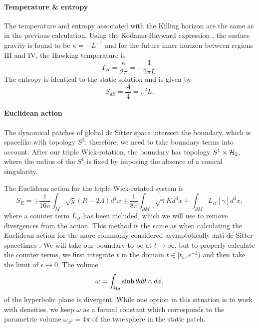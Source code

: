 \paragraph{Temperature \& entropy} The temperature and entropy associated with the Killing horizon are the same as in the previous calculation. Using the Kodama-Hayward expression , the surface gravity is found to be $\kappa = -L^{-1}$ and for the future inner horizon between regions III and IV, the Hawking temperature is
\begin{equation*}
T_H = \frac{\kappa}{2\pi} =  - \frac{1}{2\pi L}.    
\end{equation*}
The entropy is identical to the static solution and is given by
\begin{equation*}
    S_{dS} = \frac{A}{4} = \pi^2 L.
\end{equation*}

\paragraph{Euclidean action}
The dynamical patches of global de Sitter space intersect the boundary, which is spacelike with topology $S^3$, therefore, we need to take boundary terms into account. After our triple Wick-rotation, the boundary has topology ${S}^1 \times {\cal H}_2$, where the radius of the $S^1$ is fixed by imposing the absence of a conical singularity. 

The Euclidean action for the triple-Wick-rotated system is 
\begin{equation*}
    S_E = \pm \frac{1}{16 \pi} \int_M \sqrt{g} (R-2\Lambda) d^4 x \pm \frac{1}{8 \pi} \int_{\partial M} \sqrt{\gamma} K d^3x  +  \int_{\partial M}  L_{ct}[\gamma] d^3x, 
\end{equation*}
where a counter term $L_{ct}$ has been included, which we will use to  remove divergences from the action. This method is the same as when calculating the Euclidean action for the more commonly considered asymptotically anti-de Sitter spacetimes \cite{Emparan_1999, Skenderis_2002}. We will take our boundary to be at $t \rightarrow \infty$, but to properly calculate the counter terms, we first integrate $t$ in the domain $t \in [t_h, \epsilon^{-1})$ and then take the limit of $\epsilon \rightarrow 0$. The volume
\begin{equation*}
   \omega = \int_{{\cal H}_2} \sinh \theta d\theta \wedge d\phi ,
\end{equation*}
of the hyperbolic plane is divergent. While one option in this situation is to work with densities, we keep $\omega$ as a formal constant which corresponds to the parametric volume $\omega_{S^2} = 4 \pi$ of the two-sphere in the static patch.

